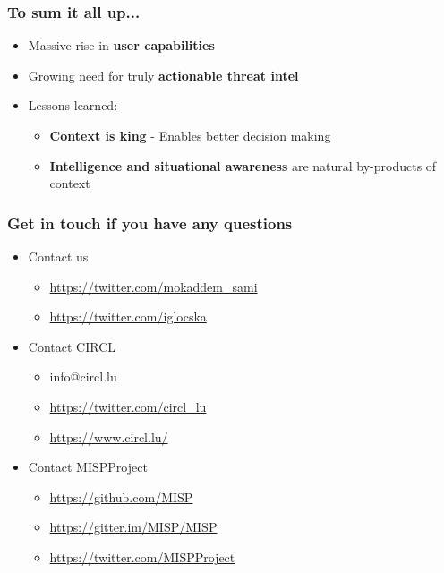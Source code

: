 \begin{frame}
  \frametitle{To sum it all up...}
  \begin{itemize}
     \item Massive rise in {\bf user capabilities}
     \item Growing need for truly {\bf actionable threat intel}
     \item Lessons learned:
     \begin{itemize}
	\item {\bf Context is king} - Enables better decision making
        \item {\bf Intelligence and situational awareness} are natural by-products of context
     \end{itemize}
  \end{itemize}
\end{frame}

\begin{frame}
  \frametitle{Get in touch if you have any questions}
  \begin{itemize}
    \item Contact us
    \begin{itemize}
      \item \url{https://twitter.com/mokaddem_sami}
      \item \url{https://twitter.com/iglocska}
    \end{itemize}
    \item Contact CIRCL
    \begin{itemize}
      \item info@circl.lu
      \item \url{https://twitter.com/circl_lu}
      \item \url{https://www.circl.lu/}
    \end{itemize}
    \item Contact MISPProject 
    \begin{itemize}
      \item \url{https://github.com/MISP}
      \item \url{https://gitter.im/MISP/MISP}
      \item \url{https://twitter.com/MISPProject}
    \end{itemize}
  \end{itemize}
\end{frame}
